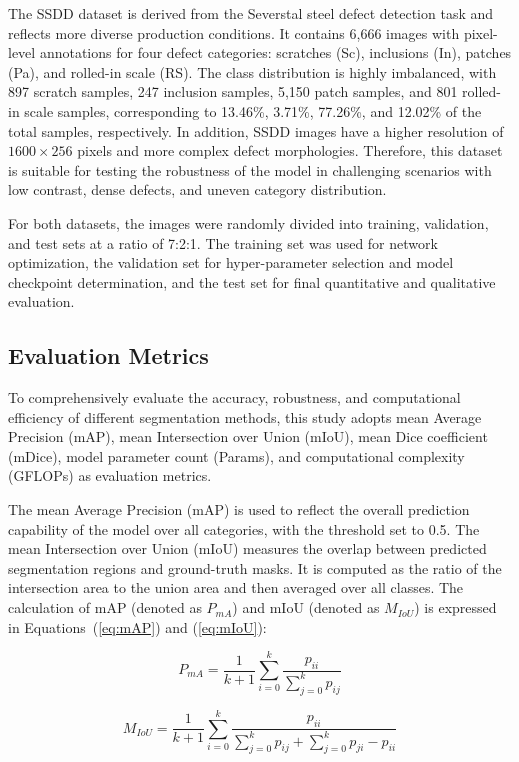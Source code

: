 \documentclass[sn-basic]{sn-jnl}
\theoremstyle{thmstyleone}%
\theoremstyle{thmstyletwo}%
\theoremstyle{thmstylethree}%
\begin{document}
The SSDD dataset is derived from the Severstal steel defect detection task and reflects more diverse production conditions. It contains 6,666 images with pixel-level annotations for four defect categories: scratches (Sc), inclusions (In), patches (Pa), and rolled-in scale (RS). The class distribution is highly imbalanced, with 897 scratch samples, 247 inclusion samples, 5,150 patch samples, and 801 rolled-in scale samples, corresponding to 13.46\%, 3.71\%, 77.26\%, and 12.02\% of the total samples, respectively. In addition, SSDD images have a higher resolution of $1600\times256$ pixels and more complex defect morphologies. Therefore, this dataset is suitable for testing the robustness of the model in challenging scenarios with low contrast, dense defects, and uneven category distribution.

For both datasets, the images were randomly divided into training, validation, and test sets at a ratio of 7:2:1. The training set was used for network optimization, the validation set for hyper-parameter selection and model checkpoint determination, and the test set for final quantitative and qualitative evaluation.

\subsection{Evaluation Metrics}
To comprehensively evaluate the accuracy, robustness, and computational efficiency of different segmentation methods, this study adopts mean Average Precision (mAP), mean Intersection over Union (mIoU), mean Dice coefficient (mDice), model parameter count (Params), and computational complexity (GFLOPs) as evaluation metrics.

The mean Average Precision (mAP) is used to reflect the overall prediction capability of the model over all categories, with the threshold set to 0.5. The mean Intersection over Union (mIoU) measures the overlap between predicted segmentation regions and ground-truth masks. It is computed as the ratio of the intersection area to the union area and then averaged over all classes. The calculation of mAP (denoted as $P_{mA}$) and mIoU (denoted as $M_{IoU}$) is expressed in Equations~(\ref{eq:mAP}) and (\ref{eq:mIoU}):

\begin{equation}
P_{mA} = \frac{1}{k+1} \sum_{i=0}^{k} \frac{p_{ii}}{\sum_{j=0}^{k} p_{ij}}
\label{eq:mAP}
\end{equation}

\begin{equation}
M_{IoU} = \frac{1}{k+1} \sum_{i=0}^{k} \frac{p_{ii}}{\sum_{j=0}^{k} p_{ij} + \sum_{j=0}^{k} p_{ji} - p_{ii}}
\label{eq:mIoU}
\end{equation}
\end{document}
